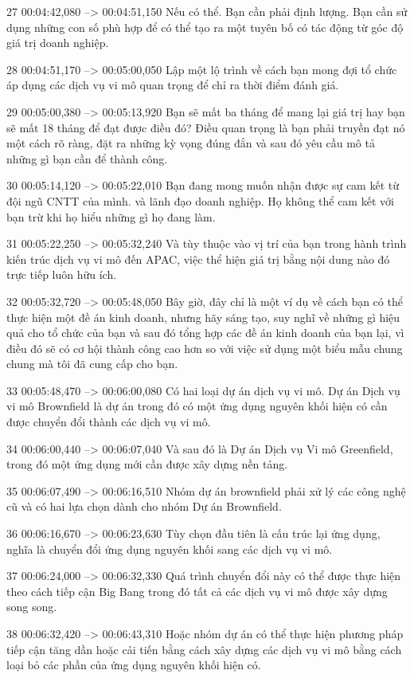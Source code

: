 27
00:04:42,080 --> 00:04:51,150
Nếu có thể.  Bạn cần phải định lượng.  Bạn cần sử dụng những con số phù hợp để có thể tạo ra một tuyên bố có tác động từ góc độ giá trị doanh nghiệp.

28
00:04:51,170 --> 00:05:00,050
Lập một lộ trình về cách bạn mong đợi tổ chức áp dụng các dịch vụ vi mô quan trọng để chỉ ra thời điểm đánh giá.

29
00:05:00,380 --> 00:05:13,920
Bạn sẽ mất ba tháng để mang lại giá trị hay bạn sẽ mất 18 tháng để đạt được điều đó?  Điều quan trọng là bạn phải truyền đạt nó một cách rõ ràng, đặt ra những kỳ vọng đúng đắn và sau đó yêu cầu mô tả những gì bạn cần để thành công.

30
00:05:14,120 --> 00:05:22,010
Bạn đang mong muốn nhận được sự cam kết từ đội ngũ CNTT của mình.  và lãnh đạo doanh nghiệp.  Họ không thể cam kết với bạn trừ khi họ hiểu những gì họ đang làm.

31
00:05:22,250 --> 00:05:32,240
Và tùy thuộc vào vị trí của bạn trong hành trình kiến ​​trúc dịch vụ vi mô đến APAC, việc thể hiện giá trị bằng nội dung nào đó trực tiếp luôn hữu ích.

32
00:05:32,720 --> 00:05:48,050
Bây giờ, đây chỉ là một ví dụ về cách bạn có thể thực hiện một đề án kinh doanh, nhưng hãy sáng tạo, suy nghĩ về những gì hiệu quả cho tổ chức của bạn và sau đó tổng hợp các đề án kinh doanh của bạn lại, vì điều đó sẽ có cơ hội thành công cao hơn so với việc sử dụng một biểu mẫu chung chung  mà tôi đã cung cấp cho bạn.

33
00:05:48,470 --> 00:06:00,080
Có hai loại dự án dịch vụ vi mô.  Dự án Dịch vụ vi mô Brownfield là dự án trong đó có một ứng dụng nguyên khối hiện có cần được chuyển đổi thành các dịch vụ vi mô.

34
00:06:00,440 --> 00:06:07,040
Và sau đó là Dự án Dịch vụ Vi mô Greenfield, trong đó một ứng dụng mới cần được xây dựng nền tảng.

35
00:06:07,490 --> 00:06:16,510
Nhóm dự án brownfield phải xử lý các công nghệ cũ và có hai lựa chọn dành cho nhóm Dự án Brownfield.

36
00:06:16,670 --> 00:06:23,630
Tùy chọn đầu tiên là cấu trúc lại ứng dụng, nghĩa là chuyển đổi ứng dụng nguyên khối sang các dịch vụ vi mô.

37
00:06:24,000 --> 00:06:32,330
Quá trình chuyển đổi này có thể được thực hiện theo cách tiếp cận Big Bang trong đó tất cả các dịch vụ vi mô được xây dựng song song.

38
00:06:32,420 --> 00:06:43,310
Hoặc nhóm dự án có thể thực hiện phương pháp tiếp cận tăng dần hoặc cải tiến bằng cách xây dựng các dịch vụ vi mô bằng cách loại bỏ các phần của ứng dụng nguyên khối hiện có.

